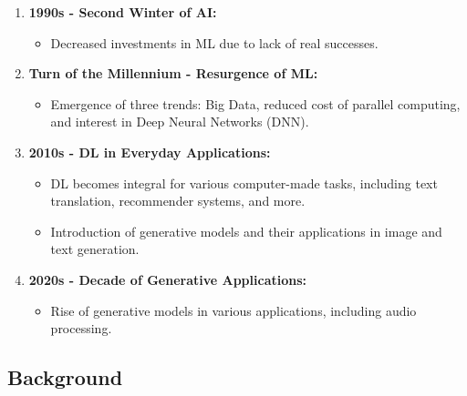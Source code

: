 \begin{frame}
\begin{enumerate}
        \item \textbf{1990s - Second Winter of AI:}
              \begin{itemize}
                  \item Decreased investments in ML due to lack of real successes.
              \end{itemize}

        \item \textbf{Turn of the Millennium - Resurgence of ML:}
              \begin{itemize}
                  \item Emergence of three trends: Big Data, reduced cost of parallel computing, and interest in Deep Neural Networks (DNN).
              \end{itemize}

        \item \textbf{2010s - DL in Everyday Applications:}
              \begin{itemize}
                  \item DL becomes integral for various computer-made tasks, including text translation, recommender systems, and more.
                  \item Introduction of generative models and their applications in image and text generation.
              \end{itemize}

        \item \textbf{2020s - Decade of Generative Applications:}
              \begin{itemize}
                  \item Rise of generative models in various applications, including audio processing.
              \end{itemize}
    \end{enumerate}
\end{frame}


\subsection{Background}

